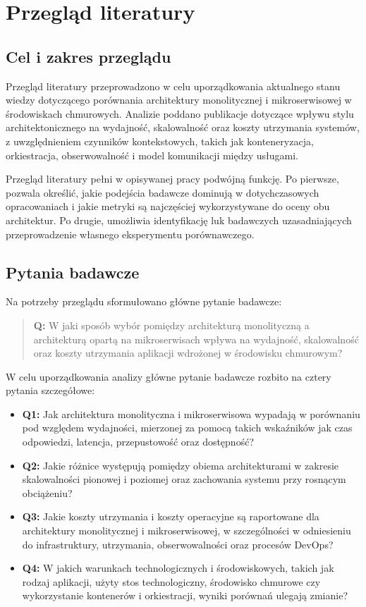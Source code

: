 \chapter{Przegląd literatury}
\label{chapter:slr}

\section{Cel i zakres przeglądu}

Przegląd literatury przeprowadzono w celu uporządkowania aktualnego stanu wiedzy dotyczącego porównania architektury monolitycznej i mikroserwisowej w środowiskach chmurowych. Analizie poddano publikacje dotyczące wpływu stylu architektonicznego na wydajność, skalowalność oraz koszty utrzymania systemów, z uwzględnieniem czynników kontekstowych, takich jak konteneryzacja, orkiestracja, obserwowalność i model komunikacji między usługami.

Przegląd literatury pełni w opisywanej pracy podwójną funkcję. Po pierwsze, pozwala określić, jakie podejścia badawcze dominują w dotychczasowych opracowaniach i jakie metryki są najczęściej wykorzystywane do oceny obu architektur. Po drugie, umożliwia identyfikację luk badawczych uzasadniających przeprowadzenie własnego eksperymentu porównawczego.


\section{Pytania badawcze}

Na potrzeby przeglądu sformułowano główne pytanie badawcze:

\begin{quote}
    \textbf{Q:} W jaki sposób wybór pomiędzy architekturą monolityczną a architekturą opartą na mikroserwisach wpływa na wydajność, skalowalność oraz koszty utrzymania aplikacji wdrożonej w środowisku chmurowym?
\end{quote}

W celu uporządkowania analizy główne pytanie badawcze rozbito na cztery pytania szczegółowe:

\begin{itemize}
    \item \textbf{Q1:} Jak architektura monolityczna i mikroserwisowa wypadają w porównaniu pod względem wydajności, mierzonej za pomocą takich wskaźników jak czas odpowiedzi, latencja, przepustowość oraz dostępność?
    \item \textbf{Q2:} Jakie różnice występują pomiędzy obiema architekturami w zakresie skalowalności pionowej i poziomej oraz zachowania systemu przy rosnącym obciążeniu?
    \item \textbf{Q3:} Jakie koszty utrzymania i koszty operacyjne są raportowane dla architektury monolitycznej i mikroserwisowej, w szczególności w odniesieniu do infrastruktury, utrzymania, obserwowalności oraz procesów DevOps?
    \item \textbf{Q4:} W jakich warunkach technologicznych i środowiskowych, takich jak rodzaj aplikacji, użyty stos technologiczny, środowisko chmurowe czy wykorzystanie kontenerów i orkiestracji, wyniki porównań ulegają zmianie?
\end{itemize}


